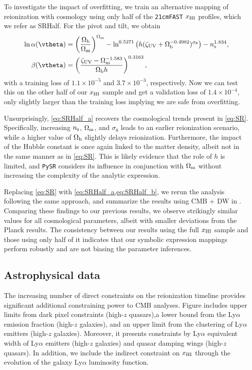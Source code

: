 To investigate the impact of overfitting, we train an alternative
mapping of reionization with cosmology using only half of the
\texttt{21cmFAST} $x_{\mathrm{HI}}$ profiles, which we refer as SRHalf.
For the pivot and tilt, we obtain
%
\begin{align}
\ln\ap(\vtheta) &= \left(\frac{\Omegab}{\Omegam}\right)^{\Omegam} - \ln^{0.5271}{\left(h(\zetaUV + \Omegab^{-0.4982})^{\sigma_8} \right) - \ns^{1.834}}, \label{eq:SRHalf_a} \\
\beta(\vtheta) &= \left( \frac{\zetaUV - \Omegam^{-1.583}}{\Omegab h }\right)^{0.3163}, \label{eq:SRHalf_b}
\end{align}
%
with a training loss of $1.1 \times 10^{-5}$ and $3.7 \times 10^{-3}$, respectively.
Now we can test this on the other half of our $x_{\mathrm{HI}}$ sample and get a
validation loss of $1.4 \times 10^{-4}$, only slightly larger than the
training loss implying we are safe from overfitting.

Unsurprisingly, \cref{eq:SRHalf_a} recovers the cosmological trends
present in \cref{eq:SR}.
Specifically, increasing $n_\mathrm{s}$, $\Omega_\mathrm{m}$, and $\sigma_8$ leads to an
earlier reionization scenario, while a higher value of $\Omega_\mathrm{b}$
slightly delays reionization.
Furthermore, the impact of the Hubble constant is once again linked to
the matter density, albeit not in the same manner as in
\cref{eq:SR}.
This is likely evidence that the role of $h$ is limited, and
\texttt{PySR} considers its influence in conjunction with $\Omega_\mathrm{m}$
without increasing the complexity of the analytic expression.

Replacing \cref{eq:SR} with \cref{eq:SRHalf_a,eq:SRHalf_b}, we rerun the analysis
following the same approach, and summarize the results using CMB + DW in
.
Comparing these findings to our previous results, we observe strikingly
similar values for all cosmological parameters, albeit with smaller
deviations from the Planck results.
The consistency between our results using the full $x_{\mathrm{HI}}$ sample and
those using only half of it indicates that our symbolic expression
mappings perform robustly and are not biasing the parameter inferences.


\subsection*{Astrophysical data}
\label{ssec:xHI}
The increasing number of direct constraints on the reionization timeline
provides significant additional constraining power to CMB analyses. Figure
 includes upper limits from dark pixel constraints\cite{Jin2023} 
(high-$z$ quasars),a lower bound from the Ly$\alpha$ emission 
fraction\cite{Mesinger2015} (high-$z$ galaxies), and an upper limit from the
clustering of Ly$\alpha$ emitters\cite{Sobacchi2015} (high-$z$ galaxies).
Moreover, it presents constraints by Ly$\alpha$ equivalent width of Ly$\alpha$ 
emitters\cite{Mason2018, Mason2018,  Hoag2019} (high-$z$ galaxies) and 
quasar damping wings\cite{Greig2022, Greig2024, Spina2024, Durovcikova2024} 
(high-$z$ quasars). In addition, we include the indirect constraint on $x_{\mathrm{HI}}$ 
through the evolution of the galaxy Ly$\alpha$ luminosity function\cite{Morales2021}.

